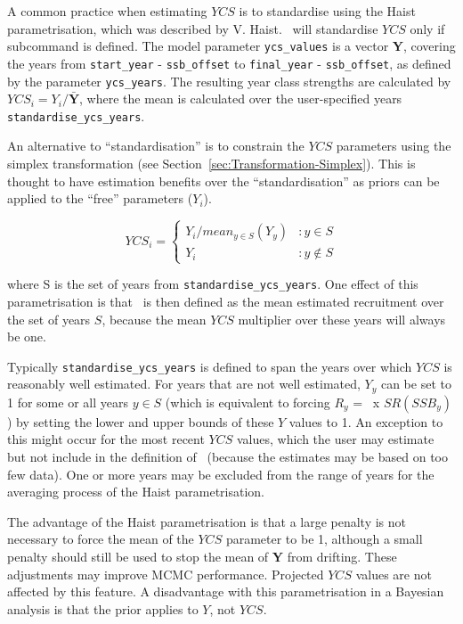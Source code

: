 A common practice when estimating $YCS$ is to standardise using the Haist parametrisation, which was described by V. Haist. \CNAME\ will standardise $YCS$ only if subcommand  is defined. The model parameter \texttt{ycs\_values} is a vector \textbf{Y}, covering the years from \texttt{start\_year} - \texttt{ssb\_offset} to \texttt{final\_year} - \texttt{ssb\_offset}, as defined by the parameter \texttt{ycs\_years}. The resulting year class strengths are calculated by $YCS_i=Y_i/\bar{\textbf{Y}}$, where the mean is calculated over the user-specified years \texttt{standardise\_ycs\_years}.


An alternative to \enquote{standardisation} is to constrain the $YCS$ parameters using the simplex transformation (see Section~\ref{sec:Transformation-Simplex}). This is thought to have estimation benefits over the \enquote{standardisation} as priors can be applied to the \enquote{free} parameters (\(Y_i\)).

\[
YCS_i =
\begin{cases}
Y_i / mean_{y \in S}(Y_y) & :y \in S\\
Y_i					 & :y \notin S
\end{cases}
\]

where S is the set of years from \texttt{standardise\_ycs\_years}. One effect of this parametrisation is that \Rzero\ is then defined as the mean estimated recruitment over the set of years $S$, because the mean $YCS$ multiplier over these years will always be one.

Typically \texttt{standardise\_ycs\_years} is defined to span the years over which $YCS$ is reasonably well estimated. For years that are not well estimated, $Y_y$ can be set to 1 for some or all years $y\in S$ (which is equivalent to forcing $R_y$ = \Rzero\ x $SR(SSB_y)$) by setting the lower and upper bounds of these $Y$ values to 1. An exception to this might occur for the most recent $YCS$ values, which the user may estimate but not include in the definition of \Rzero\ (because the estimates may be based on too few data). One or more years may be excluded from the range of years for the averaging process of the Haist parametrisation.

The advantage of the Haist parametrisation is that a large penalty is not necessary to force the mean of the $YCS$ parameter to be 1, although a small penalty should still be used to stop the mean of \textbf{Y} from drifting. These adjustments may improve MCMC performance. Projected $YCS$ values are not affected by this feature. A disadvantage with this parametrisation in a Bayesian analysis is that the prior applies to $Y$, not $YCS$.

